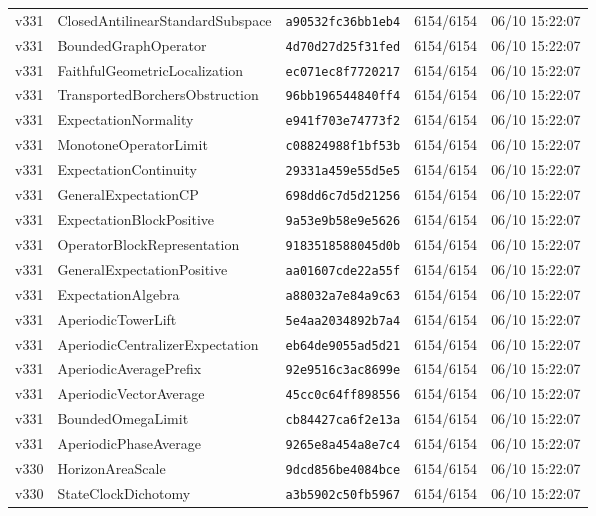 \documentclass[11pt]{article}
\theoremstyle{definition}\newtheorem{deriv}{Derivação}
\begin{document}
{\begin{longtable}{@{}lllll@{}}
v331 & ClosedAntilinearStandardSubspace & \texttt{a90532fc36bb1eb4} & 6154/6154 & 06/10 15:22:07 \\
v331 & BoundedGraphOperator & \texttt{4d70d27d25f31fed} & 6154/6154 & 06/10 15:22:07 \\
v331 & FaithfulGeometricLocalization & \texttt{ec071ec8f7720217} & 6154/6154 & 06/10 15:22:07 \\
v331 & TransportedBorchersObstruction & \texttt{96bb196544840ff4} & 6154/6154 & 06/10 15:22:07 \\
v331 & ExpectationNormality & \texttt{e941f703e74773f2} & 6154/6154 & 06/10 15:22:07 \\
v331 & MonotoneOperatorLimit & \texttt{c08824988f1bf53b} & 6154/6154 & 06/10 15:22:07 \\
v331 & ExpectationContinuity & \texttt{29331a459e55d5e5} & 6154/6154 & 06/10 15:22:07 \\
v331 & GeneralExpectationCP & \texttt{698dd6c7d5d21256} & 6154/6154 & 06/10 15:22:07 \\
v331 & ExpectationBlockPositive & \texttt{9a53e9b58e9e5626} & 6154/6154 & 06/10 15:22:07 \\
v331 & OperatorBlockRepresentation & \texttt{9183518588045d0b} & 6154/6154 & 06/10 15:22:07 \\
v331 & GeneralExpectationPositive & \texttt{aa01607cde22a55f} & 6154/6154 & 06/10 15:22:07 \\
v331 & ExpectationAlgebra & \texttt{a88032a7e84a9c63} & 6154/6154 & 06/10 15:22:07 \\
v331 & AperiodicTowerLift & \texttt{5e4aa2034892b7a4} & 6154/6154 & 06/10 15:22:07 \\
v331 & AperiodicCentralizerExpectation & \texttt{eb64de9055ad5d21} & 6154/6154 & 06/10 15:22:07 \\
v331 & AperiodicAveragePrefix & \texttt{92e9516c3ac8699e} & 6154/6154 & 06/10 15:22:07 \\
v331 & AperiodicVectorAverage & \texttt{45cc0c64ff898556} & 6154/6154 & 06/10 15:22:07 \\
v331 & BoundedOmegaLimit & \texttt{cb84427ca6f2e13a} & 6154/6154 & 06/10 15:22:07 \\
v331 & AperiodicPhaseAverage & \texttt{9265e8a454a8e7c4} & 6154/6154 & 06/10 15:22:07 \\
v330 & HorizonAreaScale & \texttt{9dcd856be4084bce} & 6154/6154 & 06/10 15:22:07 \\
v330 & StateClockDichotomy & \texttt{a3b5902c50fb5967} & 6154/6154 & 06/10 15:22:07 \\

\end{longtable}}
\end{document}
